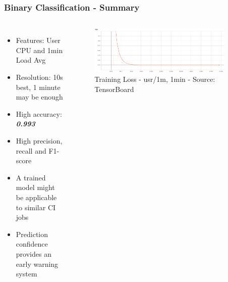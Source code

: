 \documentclass[aspectratio=169,11pt,hyperref={colorlinks=true}]{beamer}
\begin{document}
\begin{frame}
    \frametitle{Binary Classification - Summary}
    \begin{columns}
        \begin{itemize}
            \item{Features: User CPU and 1min Load Avg}
            \item{Resolution: 10s best, 1 minute may be enough}
            \item{High accuracy: \emph{\textbf{0.993}}}
            \item{High precision, recall and F1-score}
            \item{A trained model might be applicable to similar CI jobs}
            \item{Prediction confidence provides an early warning system}
        \end{itemize}
        \begin{figure}
          \begin{center}
            \includegraphics[width=0.9\textwidth,height=0.5\textheight]{graphs/cpu_1m-1min-status_loss_curve.png}
              \caption{Training Loss - usr/1m, 1min - Source: TensorBoard}
          \end{center}
        \end{figure}
      \end{columns}
\end{frame}
\end{document}
